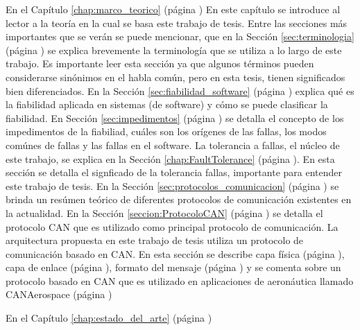 En el Capítulo \ref{chap:marco_teorico} (página \pageref{chap:marco_teorico})
En este capítulo se introduce al lector a la teoría en la cual se basa este trabajo de tesis. Entre
las secciones más importantes que se verán se puede mencionar, que en la
Sección \ref{sec:terminologia} (página \pageref{sec:terminologia}) se explica brevemente la
terminología que se utiliza a lo largo de este trabajo. Es importante leer esta sección ya que
algunos términos pueden considerarse sinónimos en el habla común, pero en esta tesis, tienen
significados bien diferenciados.
En la Sección \ref{sec:fiabilidad_software} (página \pageref{sec:fiabilidad_software}) explica
qué es la fiabilidad aplicada en sistemas (de software) y cómo se puede clasificar la fiabilidad. En
Sección \ref{sec:impedimentos} (página \pageref{sec:impedimentos}) se detalla el concepto de los
impedimentos de la fiabiliad, cuáles son los orígenes de las fallas, los modos comúnes de fallas
y las fallas en el software.
La tolerancia a fallas, el núcleo de este trabajo, se explica en la Sección \ref{chap:FaultTolerance}
(página \pageref{chap:FaultTolerance}). En esta sección se detalla el signficado de la tolerancia
fallas, importante para entender este trabajo de tesis.
En la Sección \ref{sec:protocolos_comunicacion} (página \pageref{sec:protocolos_comunicacion})
se brinda un resúmen teórico de diferentes protocolos de comunicación existentes en la actualidad.
En la Sección \ref{seccion:ProtocoloCAN} (página \pageref{seccion:ProtocoloCAN}) se detalla el
protocolo CAN que es utilizado como principal protocolo de comunicación. La arquitectura propuesta
en este trabajo de tesis utiliza un protocolo de comunicación basado en CAN. En esta sección se describe capa física (página \pageref{subsec:capafisca}), capa de enlace (página \pageref{subsec:capa_enlace}), formato del mensaje (página \pageref{subsec:formato_mensaje}) y se comenta sobre un protocolo basado en CAN que es utilizado en aplicaciones de aeronáutica llamado CANAerospace (página \pageref{subsec:CANaerospace})

En el Capítulo \ref{chap:estado_del_arte} (página \pageref{chap:estado_del_arte})


